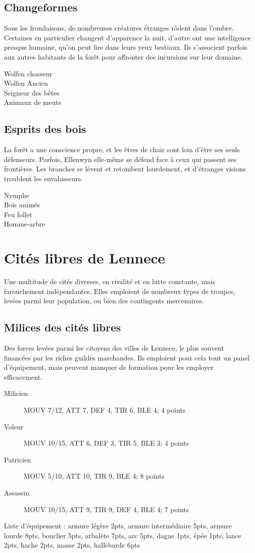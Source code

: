 \documentclass[10pt,a4paper]{article}
\begin{document}
\begin{multicols}{3}
\subsection*{Changeformes}
Sous les frondaisons, de nombreuses créatures étranges rôdent dans l'ombre. Certaines en particulier changent d'apparence la nuit, d'autre ont une intelligence presque humaine, qu'on peut lire dans leurs yeux bestiaux. Ils s'associent parfois aux autres habitants de la forêt pour affronter des incursions sur leur domaine.
\begin{description}
\item[Wolfen chasseur]
\item[Wolfen Ancien]
\item[Seigneur des bêtes]
\item[Animaux de meute]
\end{description}
\subsection*{Esprits des bois}
La forêt a une conscience propre, et les êtres de chair sont loin d'être ses seuls défenseurs. Parfois, Ellenwyn elle-même se défend face à ceux qui passent ses frontières. Les branches se lèvent et retombent lourdement, et d'étranges visions troublent les envahisseurs.
\begin{description}
\item[Nymphe]
\item[Bois animés]
\item[Feu follet]
\item[Homme-arbre]
\end{description}

\section*{Cités libres de Lennece}
Une multitude de cités diverses, en rivalité et en lutte constante, mais farouchement indépendantes. Elles emploient de nombreux types de troupes, levées parmi leur population, ou bien des contingents mercenaires.
\subsection*{Milices des cités libres}
Des forces levées parmi les citoyens des villes de Lennece, le plus souvent financées par les riches guildes marchandes. Ils emploient pour cela tout un panel d'équipement, mais peuvent manquer de formation pour les employer efficacement.
\begin{description}
\item[Milicien] MOUV 7/12, ATT 7, DEF 4, TIR 6, BLE 4; 4 points
\item[Voleur] MOUV 10/15, ATT 6, DEF 3, TIR 5, BLE 3; 4 points
\item[Patricien]MOUV 5/10, ATT 10, TIR 9, BLE 4; 8 points
\item[Assassin]MOUV 10/15, ATT 9, TIR 9, DEF 4, BLE 4; 7 points
\end{description}
Liste d'équipement : armure légère 2pts, armure intermédiaire 5pts, armure lourde 8pts, bouclier 5pts, arbalète 7pts, arc 5pts, dague 1pts, épée 1pts, lance 2pts, hache 2pts, masse 2pts, hallebarde 6pts

\end{multicols}
\end{document}
